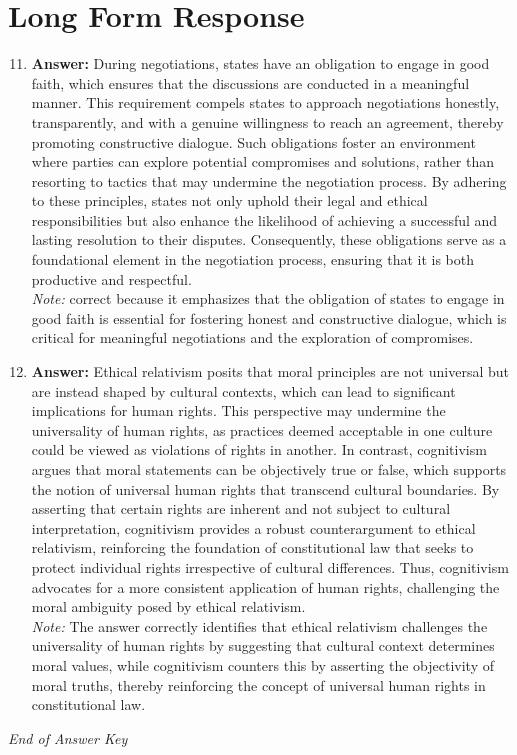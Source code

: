 \documentclass[12pt]{article}
\begin{document}
\section*{Long Form Response}
\begin{enumerate}[label=\arabic*.]
\setcounter{enumi}{10}
\item \textbf{Answer:} During negotiations, states have an obligation to engage in good faith, which ensures that the discussions are conducted in a meaningful manner. This requirement compels states to approach negotiations honestly, transparently, and with a genuine willingness to reach an agreement, thereby promoting constructive dialogue. Such obligations foster an environment where parties can explore potential compromises and solutions, rather than resorting to tactics that may undermine the negotiation process. By adhering to these principles, states not only uphold their legal and ethical responsibilities but also enhance the likelihood of achieving a successful and lasting resolution to their disputes. Consequently, these obligations serve as a foundational element in the negotiation process, ensuring that it is both productive and respectful.
\\ \textit{Note:} correct because it emphasizes that the obligation of states to engage in good faith is essential for fostering honest and constructive dialogue, which is critical for meaningful negotiations and the exploration of compromises.
\item \textbf{Answer:} Ethical relativism posits that moral principles are not universal but are instead shaped by cultural contexts, which can lead to significant implications for human rights. This perspective may undermine the universality of human rights, as practices deemed acceptable in one culture could be viewed as violations of rights in another. In contrast, cognitivism argues that moral statements can be objectively true or false, which supports the notion of universal human rights that transcend cultural boundaries. By asserting that certain rights are inherent and not subject to cultural interpretation, cognitivism provides a robust counterargument to ethical relativism, reinforcing the foundation of constitutional law that seeks to protect individual rights irrespective of cultural differences. Thus, cognitivism advocates for a more consistent application of human rights, challenging the moral ambiguity posed by ethical relativism.
\\ \textit{Note:} The answer correctly identifies that ethical relativism challenges the universality of human rights by suggesting that cultural context determines moral values, while cognitivism counters this by asserting the objectivity of moral truths, thereby reinforcing the concept of universal human rights in constitutional law.
\end{enumerate}

\vfill
\noindent\textit{End of Answer Key}
\end{document}
